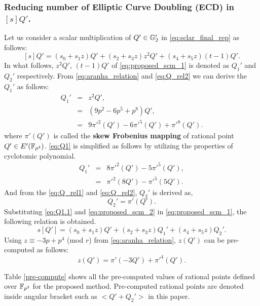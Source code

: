 \subsubsection{Reducing number of  Elliptic Curve Doubling (ECD) in $[s]Q'$.}
Let us consider a scalar multiplication of $Q' \in {\mathbb{G}}_{2}'$ in \eqref{eq:sclar_final_rep} as follows:
\begin{equation}\label{eq:proposed_scm_1}
[s]Q' =  (s_0+s_1z)Q' + (s_2 +s_3z)z^2Q'  +(s_4+s_5z)(t-1)Q'.
\end{equation}
In what follows, $z^2Q'$, $(t-1)Q'$ of \eqref{eq:proposed_scm_1} is denoted as $Q_1'$ and $Q_2'$ respectively. From \eqref{eq:aranha_relation} and \eqref{eq:Q_rel2} we can derive the $Q_1'$ as follows:
\begin{eqnarray}\label{eq:Q1}
Q_1'& = & z^2 Q', \nonumber \\
& = & (9p^2-6p^5+p^8)Q',\nonumber \\
& = & 9\pi'^2(Q')-6\pi'^5(Q')+\pi'^8(Q').
\end{eqnarray}
where $\pi' (Q')$ is called the \textbf{skew Frobenius mapping} of rational point $Q' \in E'(\mathbb{F}_{p^3})$.
\eqref{eq:Q1} is simplified as follows by utilizing the properties of cyclotomic polynomial.
\begin{eqnarray}\label{eq:Q1.1}
Q_1' & = & 8\pi'^2(Q')-5\pi'^5(Q'),  \nonumber\\
& = & \pi'^2(8Q')-\pi'^5(5Q'). 
\end{eqnarray}
And from the \eqref{eq:Q_rel1} and \eqref{eq:Q_rel2}, $Q_2'$ is derived as,
\begin{equation}\label{eq:proposed_scm_2}
Q_2' = \pi' (Q').
\end{equation}
Substituting \eqref{eq:Q1.1} and \eqref{eq:proposed_scm_2} in \eqref{eq:proposed_scm_1}, the following relation is obtained. 
\begin{equation}\label{eq:proposed_scm_0}
s[Q'] =  (s_0+s_1z)Q' + (s_2 +s_3z)Q_1' +(s_4+s_5z)Q_2'.
\end{equation}
Using $z \equiv -3p + p^4$ (mod $r$) from \eqref{eq:aranha_relation}, $z(Q')$ can be pre-computed as follows:
\begin{equation}
z(Q') = \pi'(-3Q') +\pi'^4(Q').
\end{equation}

Table \ref{pre-compute} shows all the pre-computed values of rational points defined over $\mathbb{F}_{p^3}$ for the proposed method. 
Pre-computed rational points are denoted inside angular bracket such as $<Q'+Q_2'>$ in this paper. 

